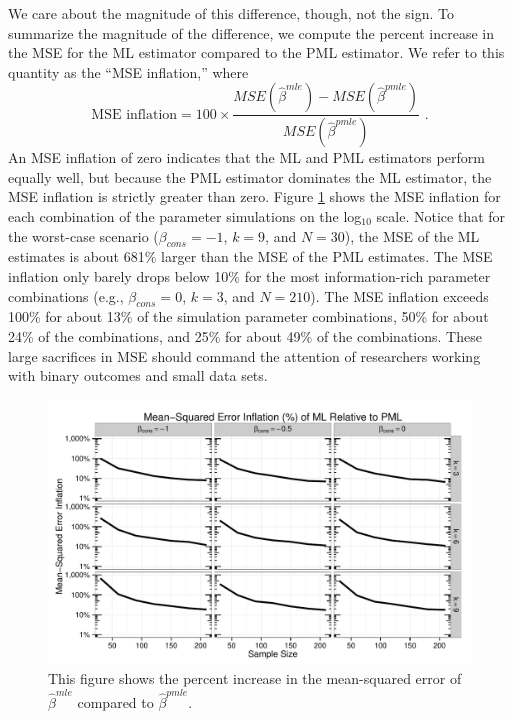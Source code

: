 \documentclass[12pt]{article}
\begin{document}
We care about the magnitude of this difference, though, not the sign.
To summarize the magnitude of the difference, we compute the percent increase in the MSE for the ML estimator compared to the PML estimator. 
We refer to this quantity as the ``MSE inflation,'' where
\begin{equation}\label{eqn:mse-infl}
\text{MSE inflation} = 100 \times \dfrac{MSE(\hat{\beta}^{mle}) - MSE(\hat{\beta}^{pmle})}{MSE(\hat{\beta}^{pmle})}  \text{ .}
\end{equation}
An MSE inflation of zero indicates that the ML and PML estimators perform equally well, but because the PML estimator dominates the ML estimator, the MSE inflation is strictly greater than zero.
Figure \ref{fig:mse-infl} shows the MSE inflation for each combination of the parameter simulations on the log$_{10}$ scale.
Notice that for the worst-case scenario ($\beta_{cons} = -1$, $k = 9$, and $N = 30$), the MSE of the ML estimates is about 681\% larger than the MSE of the PML estimates.
The MSE inflation only barely drops below 10\% for the most information-rich parameter combinations (e.g., $\beta_{cons} = 0$, $k = 3$, and $N = 210$).
The MSE inflation exceeds 100\% for about 13\% of the simulation parameter combinations, 50\% for about 24\% of the combinations, and 25\% for about 49\% of the combinations.
These large sacrifices in MSE should command the attention of researchers working with binary outcomes and small data sets.

\begin{figure}[h]
\begin{center}
\includegraphics[width = \textwidth]{figs/sims-mse-infl.pdf}
\caption{This figure shows the percent increase in the mean-squared error of $\hat{\beta}^{mle}$ compared to $\hat{\beta}^{pmle}$.}\label{fig:mse-infl}
\end{center}
\end{figure}
\end{document}
